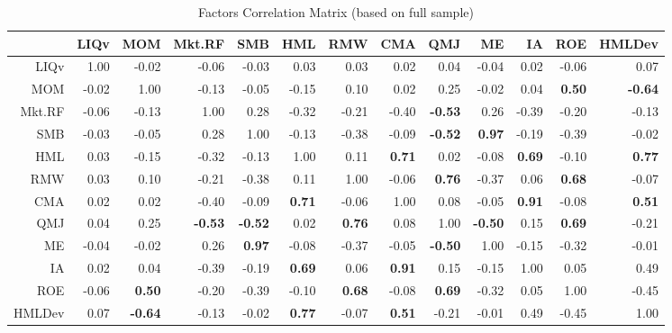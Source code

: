 \begin{table}[ht]
	\scriptsize
	\centering
	\begin{tabular}{rrrrrrrrrrrrr}
		\hline
		& LIQv & MOM & Mkt.RF & SMB & HML & RMW & CMA & QMJ & ME & IA & ROE & HMLDev \\ 
		\hline
		LIQv & 1.00 & -0.02 & -0.06 & -0.03 & 0.03 & 0.03 & 0.02 & 0.04 & -0.04 & 0.02 & -0.06 & 0.07 \\ 
		MOM & -0.02 & 1.00 & -0.13 & -0.05 & -0.15 & 0.10 & 0.02 & 0.25 & -0.02 & 0.04 &\textbf{ 0.50} & \textbf{-0.64} \\ 
		Mkt.RF & -0.06 & -0.13 & 1.00 & 0.28 & -0.32 & -0.21 & -0.40 & \textbf{-0.53} & 0.26 & -0.39 & -0.20 & -0.13 \\ 
		SMB & -0.03 & -0.05 & 0.28 & 1.00 & -0.13 & -0.38 & -0.09 & \textbf{-0.52} & \textbf{0.97} & -0.19 & -0.39 & -0.02 \\ 
		HML & 0.03 & -0.15 & -0.32 & -0.13 & 1.00 & 0.11 & \textbf{0.71} & 0.02 & -0.08 & \textbf{0.69} & -0.10 & \textbf{0.77 }\\ 
		RMW & 0.03 & 0.10 & -0.21 & -0.38 & 0.11 & 1.00 & -0.06 & \textbf{0.76} & -0.37 & 0.06 & \textbf{0.68} & -0.07 \\ 
		CMA & 0.02 & 0.02 & -0.40 & -0.09 & \textbf{0.71} & -0.06 & 1.00 & 0.08 & -0.05 & \textbf{0.91} & -0.08 & \textbf{0.51} \\ 
		QMJ & 0.04 & 0.25 & \textbf{-0.53} & \textbf{-0.52} & 0.02 & \textbf{0.76} & 0.08 & 1.00 & \textbf{-0.50} & 0.15 & \textbf{0.69} & -0.21 \\ 
		ME & -0.04 & -0.02 & 0.26 & \textbf{0.97} & -0.08 & -0.37 & -0.05 & \textbf{-0.50} & 1.00 & -0.15 & -0.32 & -0.01 \\ 
		IA & 0.02 & 0.04 & -0.39 & -0.19 & \textbf{0.69} & 0.06 &\textbf{ 0.91} & 0.15 & -0.15 & 1.00 & 0.05 & 0.49 \\ 
		ROE & -0.06 & \textbf{0.50} & -0.20 & -0.39 & -0.10 & \textbf{0.68} & -0.08 & \textbf{0.69} & -0.32 & 0.05 & 1.00 & -0.45 \\ 
		HMLDev & 0.07 & \textbf{-0.64} & -0.13 & -0.02 & \textbf{0.77} & -0.07 & \textbf{0.51} & -0.21 & -0.01 & 0.49 & -0.45 & 1.00 \\ 
		\hline
	\end{tabular}
	\caption{Factors Correlation Matrix (based on full sample)}
\end{table}
